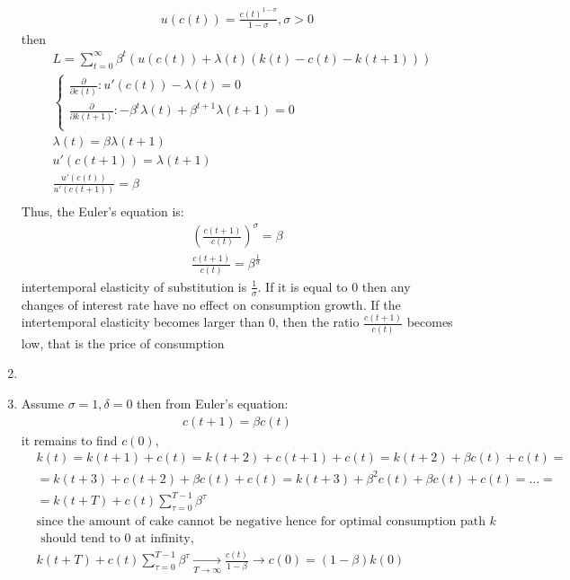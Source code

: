 \documentclass[a4paper]{article}
\begin{document}
\begin{enumerate}
\begin{align*}
	u(c(t)) = \frac{c(t)^{1 - \sigma}}{1 - \sigma}, \sigma > 0
\end{align*}
then
\begin{align*}
&L = \sum_{t=0}^{\infty} \beta^t(u(c(t)) + \lambda(t)(k(t) - c(t) - k(t+1)))\\
&\begin{cases}\frac{\partial}{\partial c(t)}: u'(c(t)) - \lambda(t) = 0\\
\frac{\partial}{\partial k(t+1)}: -\beta^t \lambda(t) + \beta^{t+1}\lambda(t+1) = 0\\
\end{cases}\\
&\lambda(t) = \beta \lambda(t+1)\\
&u'(c(t+1)) = \lambda(t+1)\\
&\frac{u'(c(t))}{u'(c(t+1))} = \beta\\
\end{align*}
Thus, the Euler's equation is:
\begin{align*}
\left(\frac{c(t+1)}{c(t)}\right)^{\sigma} = \beta\\
\frac{c(t+1)}{c(t)} = \beta^{\frac{1}{\sigma}}
\end{align*}
intertemporal elasticity of substitution is $\frac{1}{\sigma}$. If it is equal to 0 then any changes of interest rate have no effect on consumption growth. If the intertemporal elasticity becomes larger than 0, then the ratio $\frac{c(t+1)}{c(t)}$ becomes low, that is the price of consumption 
\item 
\item Assume $\sigma = 1, \delta = 0$ then
from Euler's equation:
\begin{align*}
c(t+1) = \beta c(t)
\end{align*}
it remains to find $c(0)$,
\begin{align*}
&k(t) = k(t+1) + c(t) = k(t+2) + c(t+1) + c(t) = k(t+2) + \beta c(t) + c(t) = \\
&=k(t+3) + c(t+2) + \beta c(t) + c(t) = k(t+3) + \beta^2 c(t) + \beta c(t) + c(t) = \dots =\\
&=k(t + T) + c(t) \sum_{\tau = 0}^{T-1} \beta^{\tau} \\
&\text{since the amount of cake cannot be negative hence for optimal consumption path } k\\
&\text{ should tend to 0 at infinity, }\\
&k(t + T) + c(t) \sum_{\tau = 0}^{T-1} \beta^{\tau} \underset{T \to \infty}{\to} \frac{c(t)}{1-\beta} \to c(0) = (1-\beta)k(0)
\end{align*}

\end{enumerate}
\end{document}
